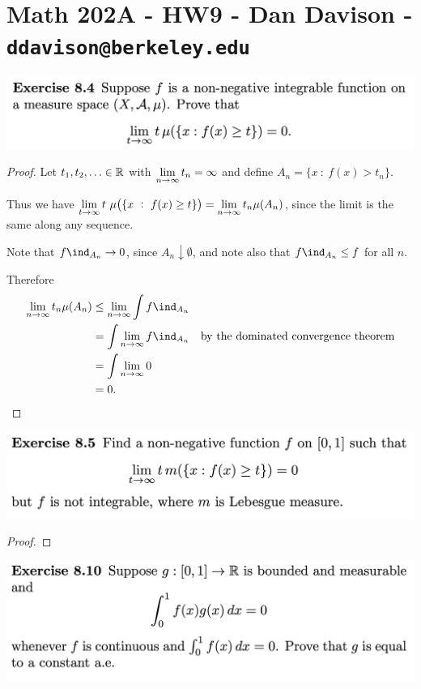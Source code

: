 \section*{Math 202A - HW9 - Dan Davison - \texttt{ddavison@berkeley.edu}}

\begin{mdframed}
\includegraphics[width=400pt]{img/analysis--berkeley-202a-hw09-210c.png}
\end{mdframed}

\begin{proof}
  Let $t_1, t_2, \ldots \in \mathbb{R}$ with $\limn t_n = \infty$ and define $A_n = \{x ~:~ f(x) > t_n\}$.

  Thus we have $\lim_{t\to\infty} t ~ \mu\big(\{x ~:~ f(x) \geq t\}\big) = \limn t_n \mu(A_n)$, since the limit
  is the same along any sequence.

  Note that $f\ind_{A_n} \to 0$, since $A_n \downarrow \emptyset$, and note also that $f\ind_{A_n} \leq f$ for
  all $n$.

  Therefore
  \begin{align*}
    \limn t_n \mu(A_n)
    &\leq \limn \int f\ind_{A_n} \\
    &= \int \limn f\ind_{A_n}             &\text{by the dominated convergence theorem}\\
    &= \int \limn 0 \\
    &= 0.
  \end{align*}
\end{proof}

\newpage
\begin{mdframed}
\includegraphics[width=400pt]{img/analysis--berkeley-202a-hw09-b0e8.png}
\end{mdframed}

\begin{proof}

\end{proof}
\newpage

\begin{mdframed}
\includegraphics[width=400pt]{img/analysis--berkeley-202a-hw09-113a.png}
\end{mdframed}

